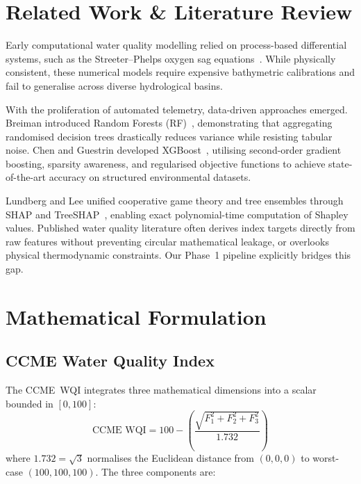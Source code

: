 \documentclass[conference]{IEEEtran}
\begin{document}
\section{Related Work \& Literature Review}
\label{sec:related}

Early computational water quality modelling relied on process-based
differential systems, such as the Streeter--Phelps oxygen sag
equations~\cite{streeter1925study}. While physically consistent, these
numerical models require expensive bathymetric calibrations and fail to
generalise across diverse hydrological basins.

With the proliferation of automated telemetry, data-driven approaches
emerged. Breiman introduced Random Forests (RF)~\cite{breiman2001random},
demonstrating that aggregating randomised decision trees drastically
reduces variance while resisting tabular noise. Chen and Guestrin
developed XGBoost~\cite{chen2016xgboost}, utilising second-order
gradient boosting, sparsity awareness, and regularised objective
functions to achieve state-of-the-art accuracy on structured
environmental datasets.

Lundberg and Lee unified cooperative game theory and tree ensembles
through SHAP and TreeSHAP~\cite{lundberg2017unified,lundberg2020local},
enabling exact polynomial-time computation of Shapley values. Published
water quality literature often derives index targets directly from raw
features without preventing circular mathematical leakage, or overlooks
physical thermodynamic constraints. Our Phase~1 pipeline explicitly
bridges this gap.

\section{Mathematical Formulation}
\label{sec:math}

\subsection{CCME Water Quality Index}

The CCME~WQI integrates three mathematical dimensions into a scalar
bounded in $[0,100]$:
\begin{equation}
  \text{CCME WQI} = 100 - \left(\frac{\sqrt{F_1^2 + F_2^2 + F_3^2}}{1.732}\right)
  \label{eq:ccme}
\end{equation}
where $1.732 = \sqrt{3}$ normalises the Euclidean distance from
$(0,0,0)$ to worst-case $(100,100,100)$. The three components are:
\end{document}
